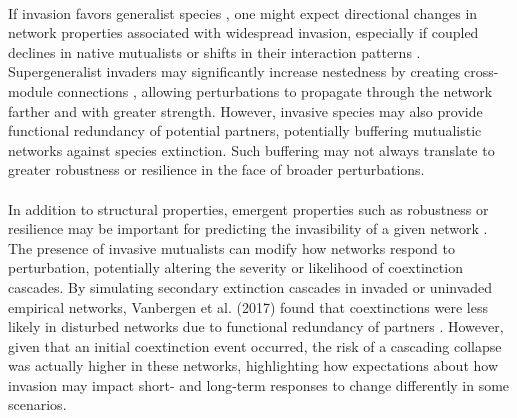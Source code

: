     \paragraph{} %
    If invasion favors generalist species \parencite{piechnik2008food, fricke2020accelerating}, one might expect directional changes in network properties associated with widespread invasion, especially if coupled declines in native mutualists or shifts in their interaction patterns \parencite{aizen2008invasive}. Supergeneralist invaders may significantly increase nestedness by creating cross-module connections \parencite{traveset2014mutualistic}, allowing perturbations to propagate through the network farther and with greater strength. However, invasive species may also provide functional redundancy of potential partners, potentially buffering mutualistic networks against species extinction. Such buffering may not always translate to greater robustness or resilience in the face of broader perturbations. 
    
    \paragraph{}
    In addition to structural properties, emergent properties such as robustness or resilience may be important for predicting the invasibility of a given network \parencite{minoarivelo2016invading}. The presence of invasive mutualists can modify how networks respond to perturbation, potentially altering the severity or likelihood of coextinction cascades. By simulating secondary extinction cascades in invaded or uninvaded empirical networks, Vanbergen et al. (2017) found that coextinctions were less likely in disturbed networks due to functional redundancy of partners \parencite{vanbergen2017network}. However, given that an initial coextinction event occurred, the risk of a cascading collapse was actually higher in these networks, highlighting how expectations about how invasion may impact short- and long-term responses to change differently in some scenarios. 
    
